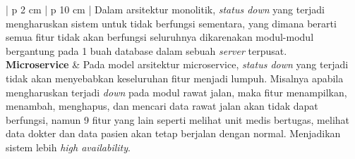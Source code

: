 \begin{enumerate}[leftmargin=*]
\begin{table}[H]
\begin{adjustbox}{width=1\textwidth}
\begin{tabular}{| p {2 cm} | p {10 cm} |}
				Dalam arsitektur monolitik, \textit{status down} yang terjadi mengharuskan sistem untuk tidak berfungsi sementara, yang dimana berarti semua fitur tidak akan berfungsi seluruhnya dikarenakan modul-modul bergantung pada 1 buah database dalam sebuah \textit{server} terpusat.
				\\
				\hline
				\textbf{Microservice} & Pada model arsitektur microservice, \textit{status down} yang terjadi tidak akan menyebabkan keseluruhan fitur menjadi lumpuh. Misalnya apabila mengharuskan terjadi \textit{down} pada modul rawat jalan, maka fitur menampilkan, menambah, menghapus, dan mencari data rawat jalan akan tidak dapat berfungsi, namun 9 fitur yang lain seperti melihat unit medis bertugas, melihat data dokter dan data pasien akan tetap berjalan dengan normal. Menjadikan sistem lebih \textit{high availability}.
				

\end{tabular}
\end{adjustbox}
\end{table}
\end{enumerate}
